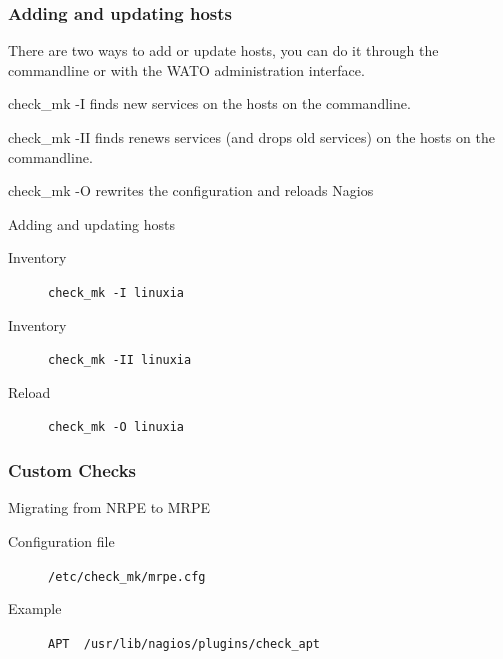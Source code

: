 \subsubsection{Adding and updating hosts}
There are two ways to add or update hosts, you can do
it through the commandline or with the WATO administration
interface.

check\_mk -I finds new services on the hosts on the commandline.

check\_mk -II finds renews services (and drops old services) 
on the hosts on the commandline.

check\_mk -O rewrites the configuration and reloads Nagios

\begin{frame}[fragile]{Adding and updating hosts}
\begin{description}
\item[Inventory] \verb|check_mk -I linuxia|
\item[Inventory] \verb|check_mk -II linuxia|
\item[Reload] \verb|check_mk -O linuxia|
\end{description}
\end{frame}




\subsubsection{Custom Checks}

\begin{frame}[fragile]{Migrating from NRPE to MRPE}
\begin{description}
\item[Configuration file] \verb|/etc/check_mk/mrpe.cfg|
\item[Example] \verb|APT  /usr/lib/nagios/plugins/check_apt|
\end{description}
\end{frame}

